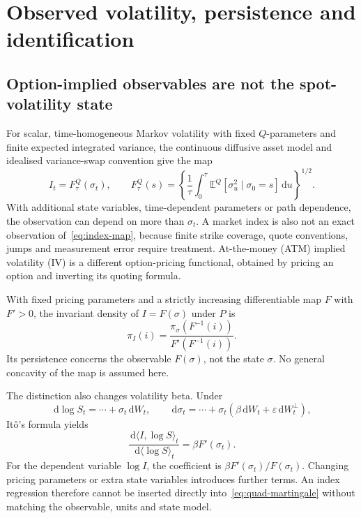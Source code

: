 \documentclass[11pt,a4paper]{article}
\theoremstyle{definition}
\theoremstyle{remark}
\newcommand{\E}{\mathbb{E}}
\newcommand{\dd}{\,\mathrm{d}}
\begin{document}
\section{Observed volatility, persistence and identification}
\label{sec:observations}

\subsection{Option-implied observables are not the spot-volatility state}

For scalar, time-homogeneous Markov volatility with fixed \(Q\)-parameters and finite expected integrated variance, the continuous diffusive asset model and idealised variance-swap convention give the map
\begin{equation}
 I_t=F_\tau^Q(\sigma_t),\qquad
 F_\tau^Q(s)=\left\{\frac1\tau\int_0^\tau
 \E^Q[\sigma_u^2\mid\sigma_0=s]\dd u\right\}^{1/2}.
 \label{eq:index-map}
\end{equation}
With additional state variables, time-dependent parameters or path dependence, the observation can depend on more than \(\sigma_t\). A market index is also not an exact observation of~\eqref{eq:index-map}, because finite strike coverage, quote conventions, jumps and measurement error require treatment. At-the-money (ATM) implied volatility (IV) is a different option-pricing functional, obtained by pricing an option and inverting its quoting formula.

With fixed pricing parameters and a strictly increasing differentiable map \(F\) with \(F'>0\), the invariant density of \(I=F(\sigma)\) under \(P\) is
\[
 \pi_I(i)=\frac{\pi_\sigma(F^{-1}(i))}{F'(F^{-1}(i))}.
\]
Its persistence concerns the observable \(F(\sigma)\), not the state \(\sigma\). No general concavity of the map is assumed here.

The distinction also changes volatility beta. Under
\[
 \dd\log S_t=\cdots+\sigma_t\dd W_t,\qquad
 \dd\sigma_t=\cdots+\sigma_t(\beta\dd W_t+\varepsilon\dd W_t^\perp),
\]
It\^o's formula yields
\begin{equation}
 \frac{\dd\langle I,\log S\rangle_t}
      {\dd\langle\log S\rangle_t}
 =\beta F'(\sigma_t).
 \label{eq:index-beta}
\end{equation}
For the dependent variable \(\log I\), the coefficient is \(\beta F'(\sigma_t)/F(\sigma_t)\). Changing pricing parameters or extra state variables introduces further terms. An index regression therefore cannot be inserted directly into~\eqref{eq:quad-martingale} without matching the observable, units and state model.
\end{document}
